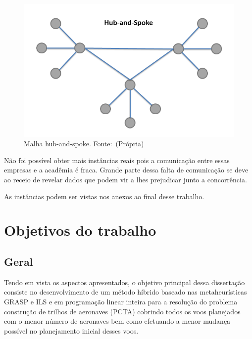 \begin{figure}[ht]
\caption{Malha hub-and-spoke. \newline \mbox{Fonte: (Própria)}}
\label{fig:hubandspoke}
\includegraphics[scale=0.35]{./img/hubandspoke}
\end{figure}
 	 	
	
Não foi possível obter mais instâncias reais pois a comunicação entre essas
empresas e a acadêmia é fraca. Grande parte dessa falta de comunicação se deve
ao receio de revelar dados que podem vir a lhes prejudicar junto a concorrência.

As instâncias podem ser vistas nos anexos ao final desse trabalho.


\section {Objetivos do trabalho}


\subsection{Geral}
Tendo em vista os aspectos apresentados, o objetivo principal dessa dissertação
consiste no desenvolvimento de um método híbrido baseado nas metaheurísticas
GRASP e ILS e em programação linear inteira para a resolução do problema
construção de trilhos de aeronaves (PCTA) cobrindo todos os voos planejados com
o menor número de aeronaves bem como efetuando a menor mudança possível no
planejamento inicial desses voos. 

